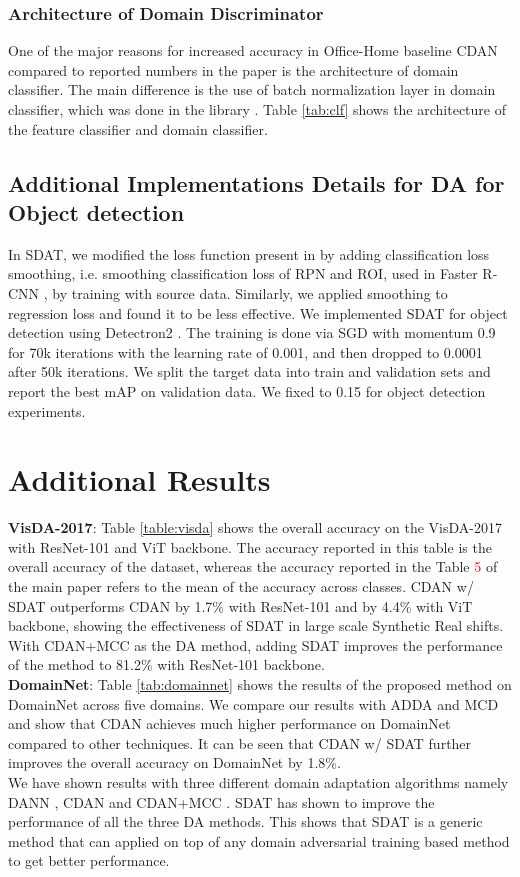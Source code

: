 \documentclass[table,dvipsnames]{article}
\theoremstyle{plain}
\theoremstyle{definition}
\theoremstyle{remark}
\begin{document}
\subsubsection{Architecture of Domain Discriminator}
One of the major reasons for increased accuracy in Office-Home baseline CDAN compared to reported numbers in the paper is the architecture of domain classifier. The main difference is the use of batch normalization layer in domain classifier, which was done in the library \citep{dalib}. Table \ref{tab:clf} shows the architecture of the feature classifier and domain classifier.


\subsection{Additional Implementations Details for DA for Object detection}
In SDAT, we modified the loss function present in \citet{chen2018domaindafaster} by adding classification loss smoothing, i.e. smoothing classification loss of RPN and ROI, used in {Faster R-CNN} \citep{ren2015faster}, by training with source data. Similarly, we applied smoothing to regression loss and found it to be less effective. We implemented SDAT for object detection using Detectron2 \citep{wu2019detectron2}. The training is done via SGD with momentum 0.9 for 70k iterations with the learning rate of 0.001, and then dropped to 0.0001 after 50k iterations. We split the target data into train and validation sets and report the best mAP on validation data. 
We fixed  to 0.15 for object detection experiments. 


\section{Additional Results}\label{app:add_results}
\textbf{VisDA-2017}:
Table \ref{table:visda} shows the overall accuracy on the VisDA-2017 with ResNet-101 and ViT backbone. The accuracy reported in this table is the overall accuracy of the dataset, whereas the accuracy reported in the Table \textcolor{red}{5} of the main paper refers to the mean of the accuracy across classes. CDAN w/ SDAT outperforms CDAN by 1.7\% with ResNet-101 and by 4.4\% with ViT backbone, showing the effectiveness of SDAT in large scale Synthetic  Real shifts. With CDAN+MCC as the DA method, adding SDAT improves the performance of the method to 81.2\% with ResNet-101 backbone.\\
\textbf{DomainNet}:
Table \ref{tab:domainnet} shows the results of the proposed method on DomainNet across five domains. We compare our results with ADDA and MCD and show that CDAN achieves much higher performance on DomainNet compared to other techniques. It can be seen that CDAN w/ SDAT further improves the overall accuracy on DomainNet by 1.8\%. 
\\
We have shown results with three different domain adaptation algorithms namely DANN \citep{ganin2015unsupervised}, CDAN \citep{long2018conditional} and CDAN+MCC \citep{jin2020minimum}. SDAT has shown to improve the performance of all the three DA methods. This shows that SDAT is a generic method that can applied on top of any domain adversarial training based method to get better performance.
\end{document}
